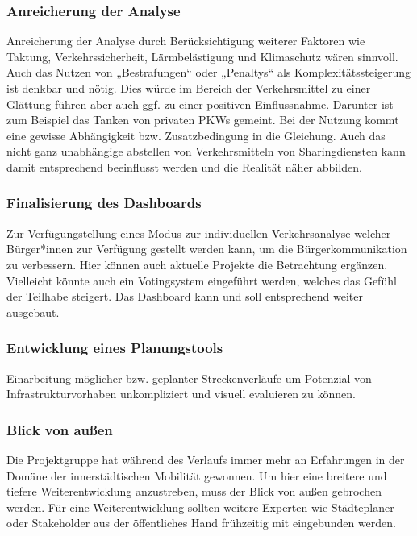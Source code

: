 \subsubsection{Anreicherung der Analyse}
Anreicherung der Analyse durch Berücksichtigung weiterer Faktoren wie Taktung, Verkehrssicherheit, Lärmbelästigung und Klimaschutz wären sinnvoll.
Auch das Nutzen von „Bestrafungen“ oder „Penaltys“ als Komplexitätssteigerung ist denkbar und nötig. Dies würde im Bereich der Verkehrsmittel zu einer Glättung führen aber auch ggf. zu einer positiven Einflussnahme.
Darunter ist zum Beispiel das Tanken von privaten PKWs gemeint. Bei der Nutzung kommt eine gewisse Abhängigkeit bzw. Zusatzbedingung in die Gleichung.
Auch das nicht ganz unabhängige abstellen von Verkehrsmitteln von Sharingdiensten kann damit entsprechend beeinflusst werden und die Realität näher abbilden.


\subsubsection{Finalisierung des Dashboards}
Zur Verfügungstellung eines Modus zur individuellen Verkehrsanalyse welcher Bürger*innen zur Verfügung gestellt werden kann, um die Bürgerkommunikation zu verbessern.
Hier können auch aktuelle Projekte die Betrachtung ergänzen. Vielleicht könnte auch ein Votingsystem eingeführt werden, welches das Gefühl der Teilhabe steigert.
Das Dashboard kann und soll entsprechend weiter ausgebaut. 





\subsubsection{Entwicklung eines Planungstools}
Einarbeitung möglicher bzw. geplanter Streckenverläufe um Potenzial von Infrastrukturvorhaben unkompliziert und visuell evaluieren zu können.


\subsubsection{Blick von außen}
Die Projektgruppe hat während des Verlaufs immer mehr an Erfahrungen in der Domäne der innerstädtischen Mobilität gewonnen. Um hier eine breitere und tiefere Weiterentwicklung anzustreben, muss der Blick von außen gebrochen werden.
Für eine Weiterentwicklung sollten weitere Experten wie Städteplaner oder Stakeholder aus der öffentliches Hand frühzeitig mit eingebunden werden.

